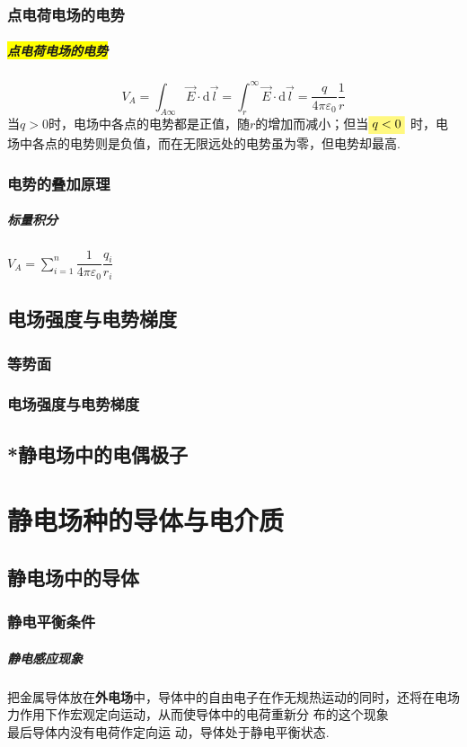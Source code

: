 \documentclass[UTF8,a4paper,12pt,scheme=chinese]{ctexbook}
\newcommand{\sll}[1]{\overrightarrow{#1}}
\newcommand{\ud}{\mathrm{d}}
\newcommand{\hl}[1]{\colorbox{yellow}{#1}}
\newcommand{\hla}[1]{%
	\colorbox{yellow!50}{$\displaystyle#1$}}
\begin{document}
	\subsection{点电荷电场的电势}
	\paragraph{\hl{点电荷电场的电势}}$$ V_A=\int_{A\infty}\sll{E}\cdot\ud\sll{l}=\int_{r}^\infty\sll{E}\cdot\ud\sll{l}=\dfrac{q}{4\pi\varepsilon_0}\dfrac{1}{r} $$
	当$ q>0 $时，电场中各点的电势都是正值，随$ r $的增加而减小；但当$ \hla{q<0} $	时，电场中各点的电势则是负值，而在无限远处的电势虽为零，但电势却最高.
	\subsection{电势的叠加原理}
	\paragraph{标量积分}$ V_A=\sum_{i=1}^{n}\dfrac{1}{4\pi\varepsilon_0}\dfrac{q_i}{r_i} $
	\section{电场强度与电势梯度}
	\subsection{等势面}
	\subsection{电场强度与电势梯度}
	\section{*静电场中的电偶极子}
	\chapter{静电场种的导体与电介质}
	\section{静电场中的导体}
	\subsection{静电平衡条件}
	\paragraph{静电感应现象}
	把金属导体放在\textbf{外电场}中，导体中的自由电子在作无规热运动的同时，还将在电场力作用下作宏观定向运动，从而使导体中的电荷重新分
	布的这个现象\\最后导体内没有电荷作定向运 
	动，导体处于静电平衡状态.
\end{document}
